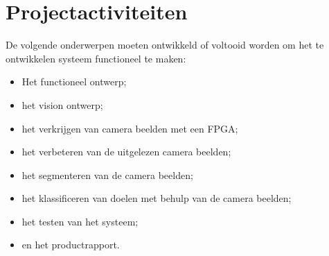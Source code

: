 \chapter{Projectactiviteiten}

De volgende onderwerpen moeten ontwikkeld of voltooid worden om het te
ontwikkelen systeem functioneel te maken:

\begin{itemize}
    \item Het functioneel ontwerp;
    \item het vision ontwerp;
    \item het verkrijgen van camera beelden met een FPGA;
    \item het verbeteren van de uitgelezen camera beelden;
    \item het segmenteren van de camera beelden;
    \item het klassificeren van doelen met behulp van de camera beelden;
    \item het testen van het systeem;
    \item en het productrapport.
\end{itemize}
